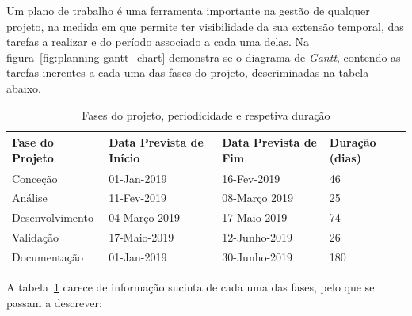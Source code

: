 Um plano de trabalho é uma ferramenta importante na gestão de qualquer projeto, na medida em que permite ter visibilidade da sua extensão temporal, das tarefas a realizar e do período associado a cada uma delas. Na figura~\ref{fig:planning-gantt_chart} demonstra-se o diagrama de \textit{Gantt}, contendo as tarefas inerentes a cada uma das fases do projeto, descriminadas na tabela abaixo.

\begin{table}[!ht]
\centering
\caption{Fases do projeto, periodicidade e respetiva duração}
\label{tab:project-phases}
\resizebox{\textwidth}{!}
{
    \begin{tabular}{|l|l|l|l|}
    \hline
    \textbf{Fase do Projeto} & \textbf{Data Prevista de Início} & \textbf{Data Prevista de Fim} & \textbf{Duração (dias)} \\ \hline
    Conceção                 & 01-Jan-2019                      & 16-Fev-2019                   & 46                      \\
    Análise                  & 11-Fev-2019                      & 08-Março 2019                 & 25                      \\
    Desenvolvimento          & 04-Março-2019                    & 17-Maio-2019                  & 74                      \\
    Validação                & 17-Maio-2019                     & 12-Junho-2019                 & 26                      \\
    Documentação             & 01-Jan-2019                      & 30-Junho-2019                 & 180                     \\ \hline
    \end{tabular}
}
\end{table}

A tabela~\ref{tab:project-phases} carece de informação sucinta de cada uma das fases, pelo que se passam a descrever:

